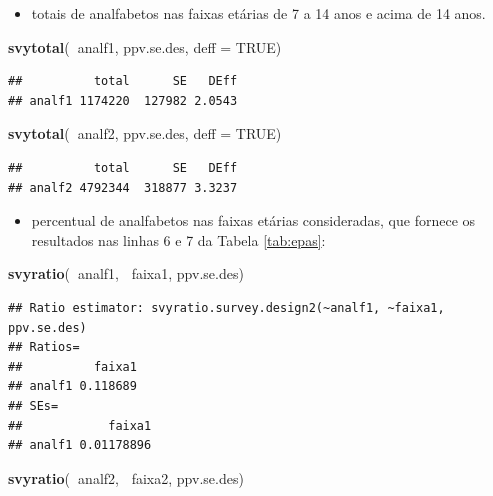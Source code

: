 \documentclass[]{book}
\newenvironment{Shaded}{\begin{snugshade}}{\end{snugshade}}
\newcommand{\KeywordTok}[1]{\textcolor[rgb]{0.13,0.29,0.53}{\textbf{#1}}}
\newcommand{\DataTypeTok}[1]{\textcolor[rgb]{0.13,0.29,0.53}{#1}}
\newcommand{\OtherTok}[1]{\textcolor[rgb]{0.56,0.35,0.01}{#1}}
\newcommand{\OperatorTok}[1]{\textcolor[rgb]{0.81,0.36,0.00}{\textbf{#1}}}
\newcommand{\NormalTok}[1]{#1}
\providecommand{\tightlist}{%
  \setlength{\itemsep}{0pt}\setlength{\parskip}{0pt}}
\theoremstyle{definition}
\theoremstyle{definition}
\theoremstyle{definition}
\theoremstyle{remark}
\begin{document}
\begin{itemize}
\tightlist
\item
  totais de analfabetos nas faixas etárias de 7 a 14 anos e acima de 14
  anos.
\end{itemize}

\begin{Shaded}
\begin{Highlighting}[]
\KeywordTok{svytotal}\NormalTok{(}\OperatorTok{~}\NormalTok{analf1, ppv.se.des, }\DataTypeTok{deff =} \OtherTok{TRUE}\NormalTok{)}
\end{Highlighting}
\end{Shaded}

\begin{verbatim}
##          total      SE   DEff
## analf1 1174220  127982 2.0543
\end{verbatim}

\begin{Shaded}
\begin{Highlighting}[]
\KeywordTok{svytotal}\NormalTok{(}\OperatorTok{~}\NormalTok{analf2, ppv.se.des, }\DataTypeTok{deff =} \OtherTok{TRUE}\NormalTok{)}
\end{Highlighting}
\end{Shaded}

\begin{verbatim}
##          total      SE   DEff
## analf2 4792344  318877 3.3237
\end{verbatim}

\begin{itemize}
\tightlist
\item
  percentual de analfabetos nas faixas etárias consideradas, que fornece
  os resultados nas linhas 6 e 7 da Tabela \ref{tab:epas}:
\end{itemize}

\begin{Shaded}
\begin{Highlighting}[]
\KeywordTok{svyratio}\NormalTok{(}\OperatorTok{~}\NormalTok{analf1, }\OperatorTok{~}\NormalTok{faixa1, ppv.se.des)}
\end{Highlighting}
\end{Shaded}

\begin{verbatim}
## Ratio estimator: svyratio.survey.design2(~analf1, ~faixa1, ppv.se.des)
## Ratios=
##          faixa1
## analf1 0.118689
## SEs=
##            faixa1
## analf1 0.01178896
\end{verbatim}

\begin{Shaded}
\begin{Highlighting}[]
\KeywordTok{svyratio}\NormalTok{(}\OperatorTok{~}\NormalTok{analf2, }\OperatorTok{~}\NormalTok{faixa2, ppv.se.des)}
\end{Highlighting}
\end{Shaded}
\end{document}
